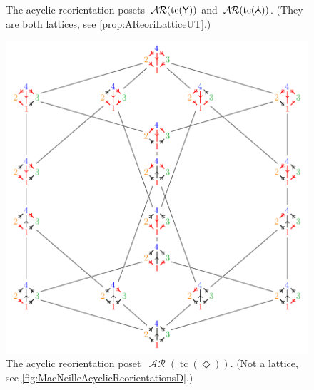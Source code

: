 \documentclass{amsart}
\theoremstyle{definition}
\renewcommand{\c}[1]{\mathcal{#1}} %
\DeclareMathOperator{\tc}{tc} %
\DeclareMathOperator{\AReori}{\c{AR}}  %
\newcommand{\Ygraph}{\sf Y} %
\newcommand{\Dgraph}{\boldsymbol{\Diamond}} %
\newcommand{\Agraph}{\rotatebox[origin=c]{180}{\sf Y}} %
\begin{document}
\begin{figure}
	\caption{The acyclic reorientation posets~$\AReori(\tc(\Ygraph))$ and~$\AReori(\tc(\Agraph))$. (They are both lattices, see \cref{prop:AReoriLatticeUT}.)}
	\label{fig:acyclicReorientationsAY}
\end{figure}

\begin{figure}
	\centerline{\includegraphics[scale=.68]{acyclicReorientationsD}}
	\caption{The acyclic reorientation poset~$\AReori(\tc(\Dgraph))$. (Not a lattice, see \cref{fig:MacNeilleAcyclicReorientationsD}.)}
	\label{fig:acyclicReorientationsD}
\end{figure}
\end{document}
